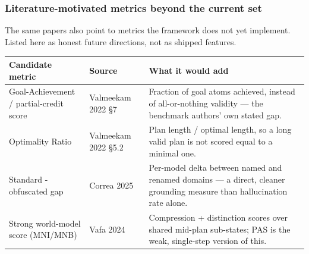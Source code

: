 \subsubsection{Literature-motivated metrics beyond the current set}

The same papers also point to metrics the framework does not yet implement. Listed here as honest future directions, not as shipped features.

\begin{table}\small
\centering
\begin{tabularx}{\linewidth}{@{}Y P I@{}}
\toprule
Candidate metric & Source & What it would add\\
\midrule
Goal-Achievement / partial-credit score & Valmeekam 2022 \S{}7 & Fraction of goal atoms achieved, instead of all-or-nothing validity --- the benchmark authors' own stated gap.\\
\addlinespace
Optimality Ratio & Valmeekam 2022 \S{}5.2 & Plan length / optimal length, so a long valid plan is not scored equal to a minimal one.\\
\addlinespace
Standard - obfuscated gap & Correa 2025 & Per-model delta between named and renamed domains --- a direct, cleaner grounding measure than hallucination rate alone.\\
\addlinespace
Strong world-model score (MNI/MNB) & Vafa 2024 & Compression + distinction scores over shared mid-plan sub-states; PAS is the weak, single-step version of this.\\
\bottomrule
\end{tabularx}
\end{table}


